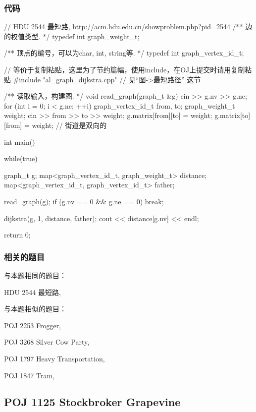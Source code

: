 \subsubsection{代码}
\begin{Codex}[label=hdu_2544.cpp]
// HDU 2544 最短路, http://acm.hdu.edu.cn/showproblem.php?pid=2544
/** 边的权值类型. */
typedef int graph_weight_t;

/** 顶点的编号，可以为char, int, string等. */
typedef int graph_vertex_id_t;

// 等价于复制粘贴，这里为了节约篇幅，使用include，在OJ上提交时请用复制粘贴
#include "al_graph_dijkstra.cpp"  // 见“图->最短路径” 这节

/** 读取输入，构建图. */
void read_graph(graph_t &g) {
    cin >> g.nv >> g.ne;
    for (int i = 0; i < g.ne; ++i) {
        graph_vertex_id_t from, to;
        graph_weight_t weight;
        cin >> from >> to >> weight;
        g.matrix[from][to] = weight;
        g.matrix[to][from] = weight;  // 街道是双向的
    }
}


int main() {
    while(true) {
        graph_t g;
        map<graph_vertex_id_t, graph_weight_t> distance;
        map<graph_vertex_id_t, graph_vertex_id_t> father;

        read_graph(g);
        if (g.nv == 0 && g.ne == 0) break;

        dijkstra(g, 1, distance, father);
        cout << distance[g.nv] << endl;
    }

    return 0;
}
\end{Codex}

\subsubsection{相关的题目}
与本题相同的题目：
\begindot
\item HDU 2544 最短路, 
\myenddot

与本题相似的题目：
\begindot
\item POJ 2253 Frogger, 
\item POJ 3268 Silver Cow Party, 
\item POJ 1797 Heavy Transportation, 
\item POJ 1847 Tram, 
\myenddot


\subsection{POJ 1125 Stockbroker Grapevine}
